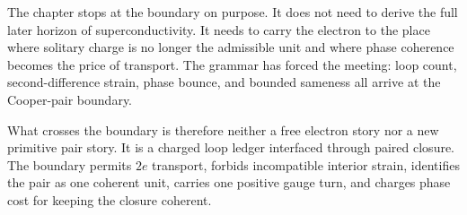 The chapter stops at the boundary on purpose. It does not need to derive the
full later horizon of superconductivity. It needs to carry the electron to
the place where solitary charge is no longer the admissible unit and where
phase coherence becomes the price of transport. The grammar has forced the
meeting: loop count, second-difference strain, phase bounce, and bounded
sameness all arrive at the Cooper-pair boundary.

What crosses the boundary is therefore neither a free electron story nor a
new primitive pair story. It is a charged loop ledger interfaced through
paired closure. The boundary permits \(2e\) transport, forbids incompatible
interior strain, identifies the pair as one coherent unit, carries one
positive gauge turn, and charges phase cost for keeping the closure coherent.
